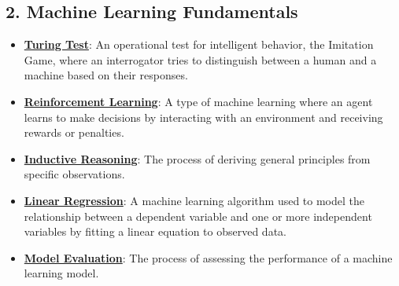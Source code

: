 \documentclass{article}%
\begin{document}
\subsection{2. Machine Learning Fundamentals}%
\label{subsec:2.MachineLearningFundamentals}%
\begin{itemize}[leftmargin=*]%
\item \href{https://purdue.brightspace.com/d2l/common/assets/pdfjs-d2l-dist/1.0.14-legacy/web/viewer.html?file=\%2Fcontent\%2Fenforced\%2F1095467-wl.202510.CS.24300.001\%2F02L2-Intro.pdf\%3Fou\%3D1095467\&lang=en-us\&container=d2l-fileviewer-rendered-pdf\&fullscreen=d2l-fileviewer-rendered-pdf-dialog\&height=667#page=6}{\textbf{Turing Test}}: An operational test for intelligent behavior, the Imitation Game, where an interrogator tries to distinguish between a human and a machine based on their responses.%
\item \href{https://purdue.brightspace.com/d2l/common/assets/pdfjs-d2l-dist/1.0.14-legacy/web/viewer.html?file=\%2Fcontent\%2Fenforced\%2F1095467-wl.202510.CS.24300.001\%2F02L2-Intro.pdf\%3Fou\%3D1095467\&lang=en-us\&container=d2l-fileviewer-rendered-pdf\&fullscreen=d2l-fileviewer-rendered-pdf-dialog\&height=667#page=46}{\textbf{Reinforcement Learning}}: A type of machine learning where an agent learns to make decisions by interacting with an environment and receiving rewards or penalties.%
\item \href{https://purdue.brightspace.com/d2l/common/assets/pdfjs-d2l-dist/1.0.14-legacy/web/viewer.html?file=\%2Fcontent\%2Fenforced\%2F1095467-wl.202510.CS.24300.001\%2F05L2-ML Basics.pdf\%3Fou\%3D1095467\&lang=en-us\&container=d2l-fileviewer-rendered-pdf\&fullscreen=d2l-fileviewer-rendered-pdf-dialog\&height=667#page=3}{\textbf{Inductive Reasoning}}: The process of deriving general principles from specific observations.%
\item \href{https://purdue.brightspace.com/d2l/common/assets/pdfjs-d2l-dist/1.0.14-legacy/web/viewer.html?file=\%2Fcontent\%2Fenforced\%2F1095467-wl.202510.CS.24300.001\%2F05L2-ML Basics.pdf\%3Fou\%3D1095467\&lang=en-us\&container=d2l-fileviewer-rendered-pdf\&fullscreen=d2l-fileviewer-rendered-pdf-dialog\&height=667#page=6}{\textbf{Linear Regression}}: A machine learning algorithm used to model the relationship between a dependent variable and one or more independent variables by fitting a linear equation to observed data.%
\item \href{https://purdue.brightspace.com/d2l/common/assets/pdfjs-d2l-dist/1.0.14-legacy/web/viewer.html?file=\%2Fcontent\%2Fenforced\%2F1095467-wl.202510.CS.24300.001\%2F05L2-ML Basics.pdf\%3Fou\%3D1095467\&lang=en-us\&container=d2l-fileviewer-rendered-pdf\&fullscreen=d2l-fileviewer-rendered-pdf-dialog\&height=667#page=8}{\textbf{Model Evaluation}}: The process of assessing the performance of a machine learning model.%

\end{itemize}
\end{document}

